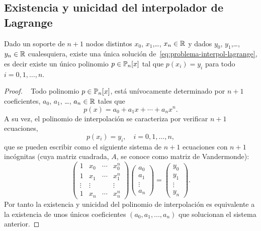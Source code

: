 \subsection{Existencia y unicidad del interpolador de Lagrange}
\label{sec:exist-y-unic-lagrange}

\begin{theorem}
  \label{thm:existencia-unicidad-lagrange}
  Dado un soporte de $n+1$ nodos distintos $x_0$, $x_1$,\dots, $x_n
  \in \operatorname{{\mathbb R}}$ y dados $y_0$, $y_1$,\dots, $y_n\in\operatorname{{\mathbb R}}$ cualesquiera,
  existe una única solución de~\eqref{eq:problema-interpol-lagrange},
  es decir existe un único polinomio $p\in\operatorname{{\mathbb P}}_n[x]$ tal que
  $p(x_i)=y_i$ para todo $i=0,1,\dots,n$.
\end{theorem}
\begin{proof}~
  Todo polinomio $p\in\operatorname{{\mathbb P}}_n[x]$, está unívocamente determinado por
  $n+1$ coeficientes, $a_0$, $a_1$, \dots, $a_n\in\operatorname{{\mathbb R}}$ tales que
  \begin{equation}
    p(x)=a_0 + a_1 x + \cdots + a_n x^n.
  \end{equation}
  A su vez, el polinomio de interpolación se caracteriza por verificar
  $n+1$ ecuaciones,
  $$
  p(x_i)=y_i, \quad i=0,1,\dots,n,
  $$
  que se pueden escribir como el siguiente sistema de $n+1$ ecuaciones
  con $n+1$ incógnitas (cuya matriz cuadrada, $A$, se conoce como
  matriz de Vandermonde):
  \begin{equation}
    \begin{pmatrix}
      1 & x_0& \cdots & x_0^n \\
      1 & x_1& \cdots & x_1^n \\
      \vdots & \vdots & & \vdots \\
      1 & x_n& \cdots & x_n^n
    \end{pmatrix}
    \begin{pmatrix}
      a_0 \\ a_1 \\ \vdots \\ a_n
    \end{pmatrix}
    =
    \begin{pmatrix}
      y_0 \\ y_1 \\ \vdots \\ y_n
    \end{pmatrix}.
    \label{eq:sistema.Vandermonde}
  \end{equation}
  Por tanto la existencia y unicidad del polinomio de interpolación es
  equivalente a la existencia de unos únicos coeficientes
  $(a_0,a_1,...,a_n)$ que solucionan el sistema anterior.


\end{proof}
